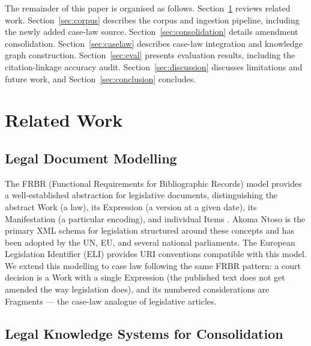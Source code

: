 \documentclass{IOS-Book-Article}
\begin{document}
The remainder of this paper is organised as follows. Section~\ref{sec:related} reviews related work.
Section~\ref{sec:corpus} describes the corpus and ingestion pipeline, including the newly added case-law
source. Section~\ref{sec:consolidation} details amendment consolidation. Section~\ref{sec:caselaw} describes case-law integration
and knowledge graph construction. Section~\ref{sec:eval} presents evaluation results, including the
citation-linkage accuracy audit. Section~\ref{sec:discussion} discusses limitations and future work, and
Section~\ref{sec:conclusion} concludes.

\section{Related Work}
\label{sec:related}

\subsection{Legal Document Modelling}

The FRBR (Functional Requirements for Bibliographic Records) model provides a
well-established abstraction for legislative documents, distinguishing the abstract Work
(a law), its Expression (a version at a given date), its Manifestation (a particular
encoding), and individual Items \cite{ifla1998}. Akoma Ntoso \cite{palmirani2011a} is
the primary XML schema for legislation structured around these concepts and has been adopted
by the UN, EU, and several national parliaments. The European Legislation Identifier (ELI)
\cite{pubsoffice2012} provides URI conventions compatible with this model. We extend
this modelling to case law following the same FRBR pattern: a court decision is a Work with
a single Expression (the published text does not get amended the way legislation does), and
its numbered considerations are Fragments --- the case-law analogue of legislative articles.

\subsection{Legal Knowledge Systems for Consolidation}
\end{document}
